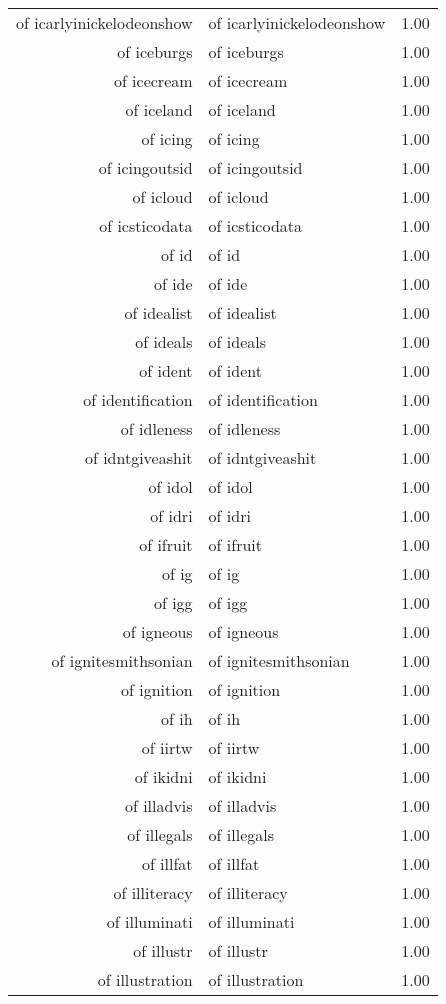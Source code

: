 \begin{table}[ht]
\begin{tabular}{rlr}
  of icarlyinickelodeonshow & of icarlyinickelodeonshow & 1.00 \\ 
  of iceburgs & of iceburgs & 1.00 \\ 
  of icecream & of icecream & 1.00 \\ 
  of iceland & of iceland & 1.00 \\ 
  of icing & of icing & 1.00 \\ 
  of icingoutsid & of icingoutsid & 1.00 \\ 
  of icloud & of icloud & 1.00 \\ 
  of icsticodata & of icsticodata & 1.00 \\ 
  of id & of id & 1.00 \\ 
  of ide & of ide & 1.00 \\ 
  of idealist & of idealist & 1.00 \\ 
  of ideals & of ideals & 1.00 \\ 
  of ident & of ident & 1.00 \\ 
  of identification & of identification & 1.00 \\ 
  of idleness & of idleness & 1.00 \\ 
  of idntgiveashit & of idntgiveashit & 1.00 \\ 
  of idol & of idol & 1.00 \\ 
  of idri & of idri & 1.00 \\ 
  of ifruit & of ifruit & 1.00 \\ 
  of ig & of ig & 1.00 \\ 
  of igg & of igg & 1.00 \\ 
  of igneous & of igneous & 1.00 \\ 
  of ignitesmithsonian & of ignitesmithsonian & 1.00 \\ 
  of ignition & of ignition & 1.00 \\ 
  of ih & of ih & 1.00 \\ 
  of iirtw & of iirtw & 1.00 \\ 
  of ikidni & of ikidni & 1.00 \\ 
  of illadvis & of illadvis & 1.00 \\ 
  of illegals & of illegals & 1.00 \\ 
  of illfat & of illfat & 1.00 \\ 
  of illiteracy & of illiteracy & 1.00 \\ 
  of illuminati & of illuminati & 1.00 \\ 
  of illustr & of illustr & 1.00 \\ 
  of illustration & of illustration & 1.00 \\ 

\end{tabular}
\end{table}
